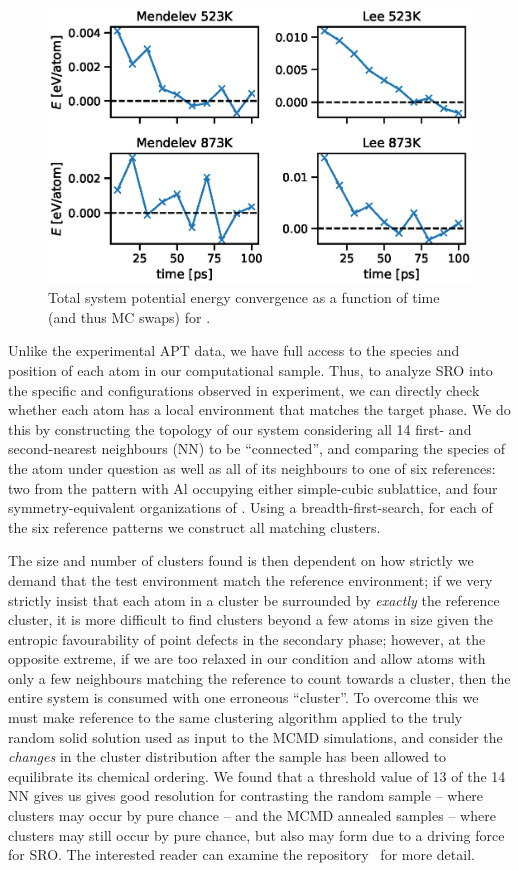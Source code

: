 \begin{figure}[h]
    \centering
    \includegraphics[width=\textwidth]{figures/energy_conv}
    \caption{Total system potential energy convergence as a function of time (and thus MC swaps) for .}
    \label{fig:energy_conv}
\end{figure}

Unlike the experimental APT data, we have full access to the species and position of each atom in our computational sample.
Thus, to analyze SRO into the specific \DOTHREE and \BTWO configurations observed in experiment, we can directly check whether each atom has a local environment that matches the target phase.
We do this by constructing the topology of our system considering all 14 first- and second-nearest neighbours (NN) to be ``connected'', and comparing the species of the atom under question as well as all of its neighbours to one of six references: two from the \BTWO pattern with Al occupying either simple-cubic sublattice, and four symmetry-equivalent organizations of \DOTHREE.
Using a breadth-first-search, for each of the six reference patterns we construct all matching clusters.

The size and number of clusters found is then dependent on how strictly we demand that the test environment match the reference environment;
if we very strictly insist that each atom in a cluster be surrounded by \emph{exactly} the reference cluster, it is more difficult to find clusters beyond a few atoms in size given the entropic favourability of point defects in the secondary phase;
however, at the opposite extreme, if we are too relaxed in our condition and allow atoms with only a few neighbours matching the reference to count towards a cluster, then the entire system is consumed with one erroneous ``cluster''.
To overcome this we must make reference to the same clustering algorithm applied to the truly random solid solution used as input to the MCMD simulations, and consider the \emph{changes} in the cluster distribution after the sample has been allowed to equilibrate its chemical ordering.
We found that a threshold value of 13 of the 14 NN gives us gives good resolution for contrasting the random sample -- where clusters may occur by pure chance -- and the MCMD annealed samples -- where clusters may still occur by pure chance, but also may form due to a driving force for SRO.
The interested reader can examine the  repository~\cite{feal} for more detail.

